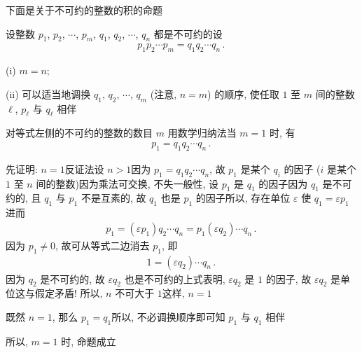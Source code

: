 下面是关于不可约的整数的积的命题\period

\begin{proposition}
    设整数 $p_1$, $p_2$, $\cdots$, $p_m$, $q_1$, $q_2$, $\cdots$, $q_n$ 都是不可约的\period 设
    \begin{align*}
        p_1 p_2 \cdots p_m = q_1 q_2 \cdots q_n \period
    \end{align*}

    (i) $m = n$;

    (ii) 可以适当地调换 $q_1$, $q_2$, $\cdots$, $q_m$ (注意, $n = m$) 的顺序, 使任取 $1$ 至 $m$ 间的整数 $\ell$, $p_{\ell}$ 与 $q_{\ell}$ 相伴\period
\end{proposition}

\begin{pf}
    对等式左侧的不可约的整数的数目 $m$ 用数学归纳法\period 当 $m = 1$ 时, 有
    \begin{align*}
        p_1 = q_1 q_2 \cdots q_n \period
    \end{align*}

    先证明: $n = 1$\period 反证法\period 设 $n > 1$\period 因为 $p_1 = q_1 q_2 \cdots q_n$, 故 $p_1$ 是某个 $q_i$ 的因子 ($i$ 是某个 $1$ 至 $n$ 间的整数)\period 因为乘法可交换, 不失一般性, 设 $p_1$ 是 $q_1$ 的因子\period 因为 $q_1$ 是不可约的, 且 $q_1$ 与 $p_1$ 不是互素的, 故 $q_1$ 也是 $p_1$ 的因子\period 所以, 存在单位 $\varepsilon$ 使 $q_1 = \varepsilon p_1$\period 进而
    \begin{align*}
        p_1 = (\varepsilon p_1) q_2 \cdots q_n = p_1 (\varepsilon q_2) \cdots q_n \period
    \end{align*}
    因为 $p_1 \neq 0$, 故可从等式二边消去 $p_1$, 即
    \begin{align*}
        1 = (\varepsilon q_2) \cdots q_n \period
    \end{align*}
    因为 $q_2$ 是不可约的, 故 $\varepsilon q_2$ 也是不可约的\period 上式表明, $\varepsilon q_2$ 是 $1$ 的因子, 故 $\varepsilon q_2$ 是单位\period 这与假定矛盾! 所以, $n$ 不可大于 $1$\period 这样, $n = 1$\period

    既然 $n = 1$, 那么 $p_1 = q_1$\period 所以, 不必调换顺序即可知 $p_1$ 与 $q_1$ 相伴\period

    所以, $m=1$ 时, 命题成立\period


\end{pf}
